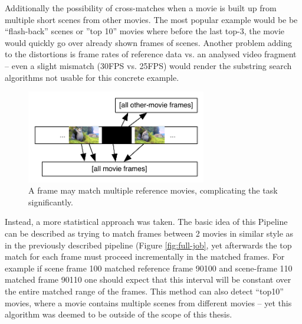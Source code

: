 Additionally the possibility of cross-matches when a movie is built up from multiple short scenes from other movies. The most popular example would be be ``flash-back'' scenes or ''top 10'' movies where before the last top-3, the movie would quickly go over already shown frames of scenes. Another problem adding to the distortions is frame rates of reference data vs. an analysed video fragment -- even a slight mismatch (30FPS vs. 25FPS) would render the substring search algorithms not usable for this concrete example.

\begin{figure}[ch!]
  \centering
  \includegraphics[width=0.70\textwidth]{img/frames-timeline-matching-missmatch}
  \caption{A frame may match multiple reference movies, complicating the task significantly.}
\end{figure}



Instead, a more statistical approach was taken. The basic idea of this Pipeline can be described as trying to match frames between 2 movies in similar style as in the previously described pipeline (Figure \ref{fig:full-job}, yet afterwards the top match for each frame must proceed incrementally in the matched frames. For example if scene frame 100 matched reference frame 90100 and scene-frame 110 matched frame 90110 one should expect that this interval will be constant over the entire matched range of the frames. This method can also detect ``top10'' movies, where a movie contains multiple scenes from different movies -- yet this algorithm was deemed to be outside of the scope of this thesis.


